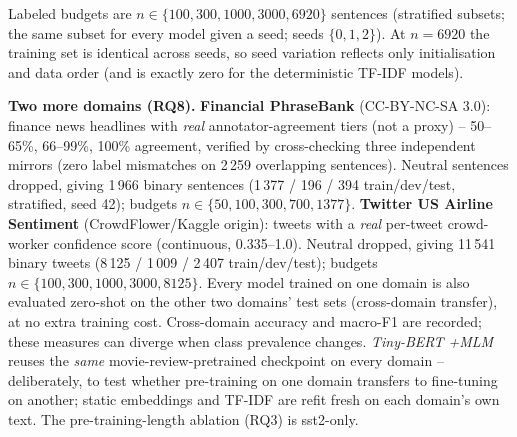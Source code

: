 \documentclass[11pt,a4paper]{article}
\begin{document}
Labeled budgets are $n\in\{100,300,1000,3000,6920\}$ sentences (stratified subsets; the same subset for every model given a seed; seeds $\{0,1,2\}$).
At $n=6920$ the training set is identical across seeds, so seed variation reflects only initialisation and data order (and is exactly zero for the deterministic TF-IDF models).

\textbf{Two more domains (RQ8).} \textbf{Financial PhraseBank} \cite{malo2014good} (CC-BY-NC-SA 3.0): finance news headlines with \emph{real} annotator-agreement tiers (not a proxy) -- 50--65\%, 66--99\%, 100\% agreement, verified by cross-checking three independent mirrors (zero label mismatches on 2\,259 overlapping sentences). Neutral sentences dropped, giving 1\,966 binary sentences (1\,377 / 196 / 394 train/dev/test, stratified, seed 42); budgets $n\in\{50,100,300,700,1377\}$.
\textbf{Twitter US Airline Sentiment} (CrowdFlower/Kaggle origin): tweets with a \emph{real} per-tweet crowd-worker confidence score (continuous, 0.335--1.0). Neutral dropped, giving 11\,541 binary tweets (8\,125 / 1\,009 / 2\,407 train/dev/test); budgets $n\in\{100,300,1000,3000,8125\}$.
Every model trained on one domain is also evaluated zero-shot on the other two domains' test sets (cross-domain transfer), at no extra training cost. Cross-domain accuracy and macro-F1 are recorded; these measures can diverge when class prevalence changes. \emph{Tiny-BERT +MLM} reuses the \emph{same} movie-review-pretrained checkpoint on every domain -- deliberately, to test whether pre-training on one domain transfers to fine-tuning on another; static embeddings and TF-IDF are refit fresh on each domain's own text. The pre-training-length ablation (RQ3) is sst2-only.
\end{document}
